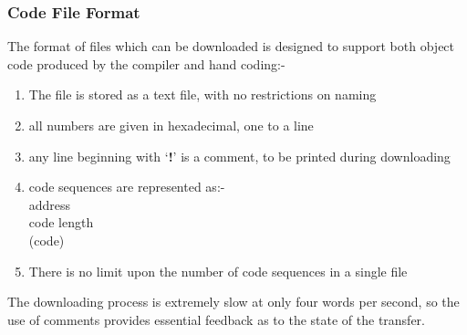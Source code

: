 \subsubsection{Code File Format}
The format of files which can be downloaded is designed to support both
object code produced by the compiler and hand coding:-
\begin{enumerate}
\item The file is stored as a text file, with no restrictions on naming
\item all numbers are given in hexadecimal, one to a line
\item any line beginning with `{\bf !}' is a comment, to be printed during
downloading
\item code sequences are represented as:-\\
address\\
code length\\
(code)\\
\item There is no limit upon the number of code sequences in a single file
\end{enumerate}
The downloading process is extremely slow at only four words per second, so the use of comments provides essential feedback as to the state of the transfer.

